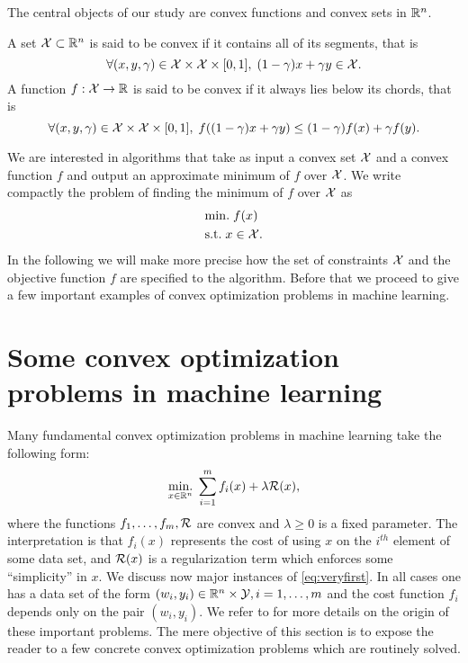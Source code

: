 The central objects of our study are convex functions and convex sets in $\mathbb{R}^n$.

\begin{definition}
A set $\mathcal{X} \subset \mathbb{R}^n$ is said to be convex if it contains all of its segments, that is
$$\forall (x,y,\gamma) \in \mathcal{X} \times \mathcal{X} \times [0,1], \; (1-\gamma) x + \gamma y \in \mathcal{X}.$$
A function $f : \mathcal{X} \rightarrow \mathbb{R}$ is said to be convex if it always lies below its chords, that is
$$ \forall (x,y,\gamma) \in \mathcal{X} \times \mathcal{X} \times [0,1], \; f((1-\gamma) x + \gamma y) \leq (1-\gamma)f(x) + \gamma f(y) .$$
\end{definition}
We are interested in algorithms that take as input a convex set $\mathcal{X}$ and a convex function $f$ and output an approximate minimum of $f$ over $\mathcal{X}$. We write compactly the problem of finding the minimum of $f$ over $\mathcal{X}$ as
\begin{align*}
& \mathrm{min.} \; f(x) \\
& \text{s.t.} \; x \in \mathcal{X} .
\end{align*}
In the following we will make more precise how the set of constraints $\mathcal{X}$ and the objective function $f$ are specified to the algorithm. Before that we proceed to give a few important examples of convex optimization problems in machine learning.

\section{Some convex optimization problems in machine learning} \label{sec:mlapps}
Many fundamental convex optimization problems in machine learning take the following form:
\begin{equation} \label{eq:veryfirst}
\underset{x \in \mathbb{R}^n}{\mathrm{min.}} \; \sum_{i=1}^m f_i(x) + \lambda \mathcal{R}(x) ,
\end{equation}
where the functions $f_1, \hdots, f_m, \mathcal{R}$ are convex and $\lambda \geq 0$ is a fixed parameter. The interpretation is that $f_i(x)$ represents the cost of using $x$ on the $i^{th}$ element of some data set, and $\mathcal{R}(x)$ is a regularization term which enforces some ``simplicity'' in $x$. We discuss now major instances of \eqref{eq:veryfirst}. In all cases one has a data set of the form $(w_i, y_i) \in \mathbb{R}^n \times \mathcal{Y}, i=1, \hdots, m$ and the cost function $f_i$ depends only on the pair $(w_i, y_i)$. We refer to \cite{HTF01, SS02, SSS14} for more details on the origin of these important problems. The mere objective of this section is to expose the reader to a few concrete convex optimization problems which are routinely solved.
 
